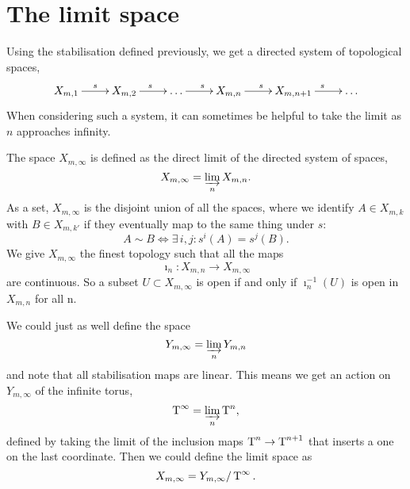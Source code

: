 
\section{The limit space}
\label{sec:rum-gr}

Using the stabilisation defined previously, we get a directed system
of topological spaces,
\[ \xymatrix{X_{m,1} \ar[r]^s & X_{m,2} \ar[r]^s & \dots \ar[r]^s &
  X_{m,n} \ar[r]^s & X_{m,n+1} \ar[r]^s & \dots } \]
When considering such a system, it can sometimes be helpful to
take the limit as $n$ approaches infinity.

\begin{definition}
  The space $X_{m,\infty}$ is defined as the direct limit of the
  directed system of spaces,
  \[ X_{m,\infty} = \varinjlim_n X_{m,n}. \]
  As a set, $X_{m,\infty}$ is the disjoint union of all the spaces,
  where we identify $A \in X_{m,k}$ with $B \in X_{m,k'}$ if they
  eventually map to the same thing under $s$:
  \[ A \sim B \iff \exists\, i,j : s^i(A) = s^j(B). \]
  We give $X_{m,\infty}$ the finest topology such that all the
  maps 
  \[ \imath_n : X_{m,n} \to X_{m,\infty} \]
  are continuous. So a subset $U \subset X_{m,\infty}$ is open if and
  only if $\imath_n^{-1}(U)$ is open in $X_{m,n}$ for all n. 
\end{definition}

We could just as well define the space 
\[ Y_{m,\infty} = \varinjlim_n Y_{m,n} \]
and note that all stabilisation maps are linear. This means we get an
action on $Y_{m,\infty}$ of the infinite torus,
\[ \operatorname{T}^\infty = \varinjlim_n \operatorname{T}^n, \]
defined by taking the
limit of the
inclusion maps $\operatorname{T}^n \to \operatorname{T}^{n+1}$ that inserts a one on the last
coordinate.
Then we could define the limit space as
\[ X_{m,\infty} = Y_{m,\infty}/\operatorname{T}^\infty. \]





